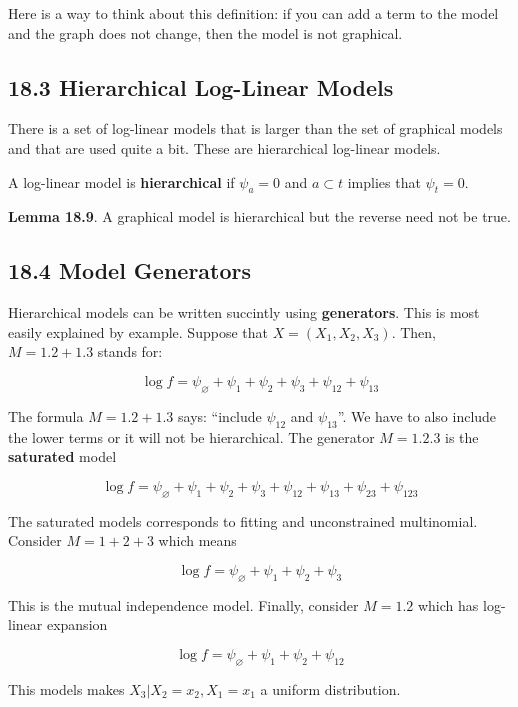 Here is a way to think about this definition: if you can add a term to
the model and the graph does not change, then the model is not
graphical.

\subsection*{18.3 Hierarchical Log-Linear Models}\label{hierarchical-log-linear-models}

There is a set of log-linear models that is larger than the set of
graphical models and that are used quite a bit. These are hierarchical
log-linear models.

A log-linear model is \textbf{hierarchical} if \(\psi_a = 0\) and
\(a \subset t\) implies that \(\psi_t = 0\).

\textbf{Lemma 18.9}. A graphical model is hierarchical but the reverse
need not be true.

\subsection*{18.4 Model Generators}\label{model-generators}

Hierarchical models can be written succintly using \textbf{generators}.
This is most easily explained by example. Suppose that
\(X = (X_{1}, X_{2}, X_{3})\). Then, \(M = 1.2 + 1.3\) stands for:

\[ \log f = \psi_\varnothing + \psi_{1} + \psi_{2} + \psi_{3} + \psi_{12} + \psi_{13}\]

The formula \(M = 1.2 + 1.3\) says: ``include \(\psi_{12}\) and
\(\psi_{13}\)''. We have to also include the lower terms or it will not be
hierarchical. The generator \(M = 1.2.3\) is the \textbf{saturated}
model

\[ \log f = \psi_\varnothing + \psi_{1} + \psi_{2} + \psi_{3} + \psi_{12} + \psi_{13} + \psi_{23} + \psi_{123}\]

The saturated models corresponds to fitting and unconstrained
multinomial. Consider \(M = 1 + 2 + 3\) which means

\[ \log f = \psi_\varnothing + \psi_{1} + \psi_{2} + \psi_{3} \]

This is the mutual independence model. Finally, consider \(M = 1.2\)
which has log-linear expansion

\[ \log f = \psi_\varnothing + \psi_{1} + \psi_{2} + \psi_{12} \]

This models makes \(X_{3} | X_{2} = x_{2}, X_{1} = x_{1}\) a uniform distribution.

